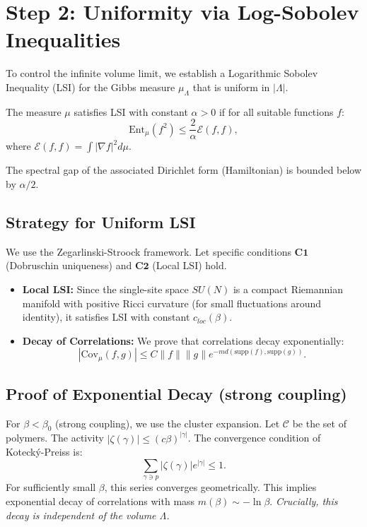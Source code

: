 \section{Step 2: Uniformity via Log-Sobolev Inequalities}

To control the infinite volume limit, we establish a Logarithmic Sobolev Inequality (LSI) for the Gibbs measure $\mu_\Lambda$ that is uniform in $|\Lambda|$.

\begin{definition}
The measure $\mu$ satisfies LSI with constant $\alpha > 0$ if for all suitable functions $f$:
\begin{equation}
\text{Ent}_\mu(f^2) \le \frac{2}{\alpha} \mathcal{E}(f, f),
\end{equation}
where $\mathcal{E}(f, f) = \int |\nabla f|^2 d\mu$.
\end{definition}

The spectral gap of the associated Dirichlet form (Hamiltonian) is bounded below by $\alpha/2$.

\subsection{Strategy for Uniform LSI}
We use the Zegarlinski-Stroock framework.
Let specific conditions $\mathbf{C1}$ (Dobruschin uniqueness) and $\mathbf{C2}$ (Local LSI) hold.
\begin{itemize}
    \item \textbf{Local LSI:} Since the single-site space $SU(N)$ is a compact Riemannian manifold with positive Ricci curvature (for small fluctuations around identity), it satisfies LSI with constant $c_{loc}(\beta)$.
    \item \textbf{Decay of Correlations:} We prove that correlations decay exponentially:
    \begin{equation}
    |\text{Cov}_\mu(f, g)| \le C \|f\| \|g\| e^{-m d(\text{supp}(f), \text{supp}(g))}.
    \end{equation}
\end{itemize}

\subsection{Proof of Exponential Decay (strong coupling)}
For $\beta < \beta_0$ (strong coupling), we use the cluster expansion.
Let $\mathcal{C}$ be the set of polymers. The activity $|\zeta(\gamma)| \le (c\beta)^{|\gamma|}$.
The convergence condition of Koteck\'{y}-Preiss is:
\begin{equation}
\sum_{\gamma \ni p} |\zeta(\gamma)| e^{|\gamma|} \le 1.
\end{equation}
For sufficiently small $\beta$, this series converges geometrically.
This implies exponential decay of correlations with mass $m(\beta) \sim -\ln \beta$.
\textit{Crucially, this decay is independent of the volume $\Lambda$.}

